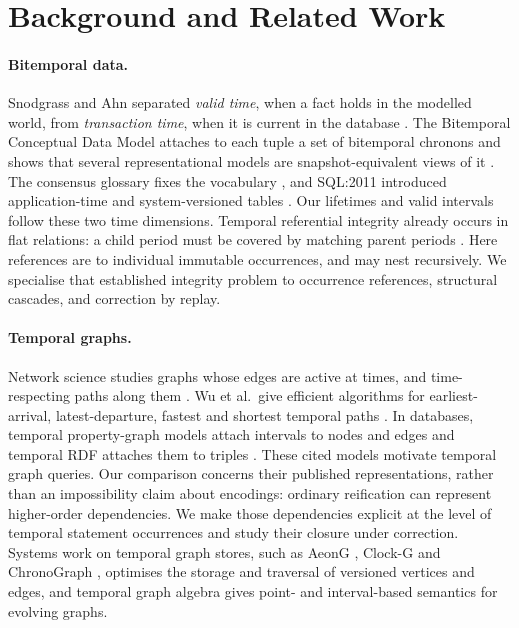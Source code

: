 \documentclass[11pt]{article}
\theoremstyle{plain}
\theoremstyle{definition}
\theoremstyle{remark}
\begin{document}
\section{Background and Related Work}\label{sec:related}

\paragraph{Bitemporal data.}
Snodgrass and Ahn separated \emph{valid time}, when a fact holds in the
modelled world, from \emph{transaction time}, when it is current in the
database \cite{snodgrass1985taxonomy}. The Bitemporal Conceptual Data Model
attaches to each tuple a set of bitemporal chronons and shows that several
representational models are snapshot-equivalent views of it
\cite{jensen1994unifying}. The consensus glossary fixes the vocabulary
\cite{jensen1998glossary}, and SQL:2011 introduced application-time and
system-versioned tables \cite{kulkarni2012temporal}. Our lifetimes and valid intervals follow these two time dimensions.
Temporal referential integrity already occurs in flat relations: a child
period must be covered by matching parent periods \cite[Section 2.2.2]{kulkarni2012temporal}.
Here references are to individual immutable occurrences, and may nest recursively.
We specialise that established integrity problem to occurrence references,
structural cascades, and correction by replay.

\paragraph{Temporal graphs.}
Network science studies graphs whose edges are active at times, and
time-respecting paths along them
\cite{kempe2002connectivity,holme2012temporal,casteigts2012tvg}. Wu et al.\
give efficient algorithms for earliest-arrival, latest-departure, fastest and
shortest temporal paths \cite{wu2014path}. In databases, temporal
property-graph models attach intervals to nodes and edges
\cite{debrouvier2021tgraph,rost2022gradoop} and temporal RDF attaches them to
triples \cite{gutierrez2007time}. These cited models motivate temporal graph queries. Our comparison concerns
their published representations, rather than an impossibility claim about
encodings: ordinary reification can represent higher-order dependencies. We
make those dependencies explicit at the level of temporal statement occurrences
and study their closure under correction.
Systems work on temporal graph stores, such as AeonG \cite{hou2024aeong},
Clock-G \cite{massri2022clockg} and ChronoGraph \cite{byun2020chronograph},
optimises the storage and traversal of versioned vertices and edges, and temporal
graph algebra \cite{moffitt2017tga} gives point- and interval-based semantics
for evolving graphs.
\end{document}
